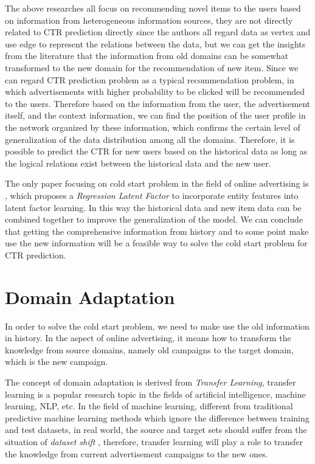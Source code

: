 The above researches all focus on recommending novel items to the users based on information from heterogeneous information sources, they are not directly related to CTR prediction directly since the authors all regard data as vertex and use edge to represent the relations between the data, but we can get the insights from the literature that the information from old domains can be somewhat transformed to the new domain for the recommendation of new item. Since we can regard CTR prediction problem as a typical recommendation problem, in which advertisements with higher probability to be clicked will be recommended to the users. Therefore based on the information from the user, the advertisement itself, and the context information, we can find the position of the user profile in the network organized by these information, which confirms the certain level of generalization of the data distribution among all the domains. Therefore, it is possible to predict the CTR for new users based on the historical data as long as the logical relations exist between the historical data and the new user. 

The only paper focusing on cold start problem in the field of online advertising is \cite{agarwal2009regression}, which proposes a \textit{Regression Latent Factor} to incorporate entity features into latent factor learning. In this way the historical data and new item data can be combined together to improve the generalization of the model. We can conclude that getting the comprehensive information from history and to some point make use the new information will be a feasible way to solve the cold start problem for CTR prediction.

\section{Domain Adaptation}
In order to solve the cold start problem, we need to make use the old information in history. In the aspect of online advertising, it means how to transform the knowledge from source domains, namely old campaigns to the target domain, which is the new campaign.

The concept of domain adaptation is derived from \textit{Transfer Learning}, transfer learning is a popular research topic in the fields of artificial intelligence, machine learning, NLP, etc. In the field of machine learning, different from traditional predictive machine learning methods which ignore the difference between training and test datasets, in real world, the source and target sets should suffer from the situation of \textit{dataset shift} \cite{quionero2009dataset}, therefore, transfer learning will play a role to transfer the knowledge from current advertisement campaigns to the new ones. 

